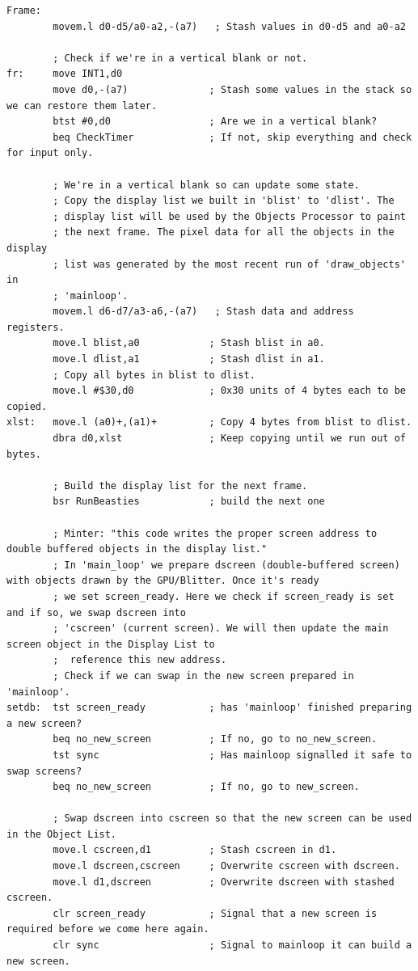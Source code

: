 \begin{lstlisting}
Frame:
        movem.l d0-d5/a0-a2,-(a7)   ; Stash values in d0-d5 and a0-a2
    
        ; Check if we're in a vertical blank or not.
fr:     move INT1,d0
        move d0,-(a7)              ; Stash some values in the stack so we can restore them later.
        btst #0,d0                 ; Are we in a vertical blank?
        beq CheckTimer             ; If not, skip everything and check for input only.
    
        ; We're in a vertical blank so can update some state.
        ; Copy the display list we built in 'blist' to 'dlist'. The
        ; display list will be used by the Objects Processor to paint
        ; the next frame. The pixel data for all the objects in the display
        ; list was generated by the most recent run of 'draw_objects' in
        ; 'mainloop'.
        movem.l d6-d7/a3-a6,-(a7)   ; Stash data and address registers.
        move.l blist,a0            ; Stash blist in a0.
        move.l dlist,a1            ; Stash dlist in a1.
        ; Copy all bytes in blist to dlist.
        move.l #$30,d0             ; 0x30 units of 4 bytes each to be copied.
xlst:   move.l (a0)+,(a1)+         ; Copy 4 bytes from blist to dlist.
        dbra d0,xlst               ; Keep copying until we run out of bytes.
    
        ; Build the display list for the next frame.
        bsr RunBeasties            ; build the next one
    
        ; Minter: "this code writes the proper screen address to double buffered objects in the display list."
        ; In 'main_loop' we prepare dscreen (double-buffered screen) with objects drawn by the GPU/Blitter. Once it's ready
        ; we set screen_ready. Here we check if screen_ready is set and if so, we swap dscreen into
        ; 'cscreen' (current screen). We will then update the main screen object in the Display List to
        ;  reference this new address.
        ; Check if we can swap in the new screen prepared in 'mainloop'.
setdb:  tst screen_ready           ; has 'mainloop' finished preparing a new screen?
        beq no_new_screen          ; If no, go to no_new_screen.
        tst sync                   ; Has mainloop signalled it safe to swap screens?
        beq no_new_screen          ; If no, go to new_screen.
    
        ; Swap dscreen into cscreen so that the new screen can be used in the Object List.
        move.l cscreen,d1          ; Stash cscreen in d1.
        move.l dscreen,cscreen     ; Overwrite cscreen with dscreen.
        move.l d1,dscreen          ; Overwrite dscreen with stashed cscreen.
        clr screen_ready           ; Signal that a new screen is required before we come here again.
        clr sync                   ; Signal to mainloop it can build a new screen.
    

\end{lstlisting}
